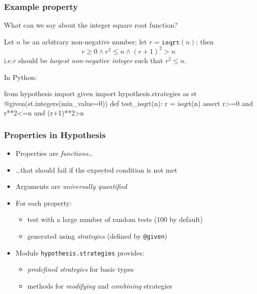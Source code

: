 \documentclass{beamer}
\begin{document}
\begin{frame}[fragile]
  \frametitle{Example property}

  What can we say about the integer square root function?
  \pause
  \medskip

  Let $n$ be an arbitrary non-negative number;
  let $r = \texttt{isqrt}(n)$; then
  \[ r\geq0 \land r^2 \leq n \land (r+1)^2>n  \]
  i.e.\@ $r$ should be \emph{largest non-negative integer} such that
  $r^2 \leq n$.
  \pause
  \medskip

  In Python:
\begin{semiverbatim}
from hypothesis import given
import hypothesis.strategies as st
@given(\alert<5>{st.integers(min_value=0)})  
def test_isqrt(\alert<4>{n}):                
    r = isqrt(n)
    assert \alert<6>{r>=0 and r**2<=n and (r+1)**2>n}   
  \end{semiverbatim}

  
\end{frame}

\begin{frame}
  \frametitle{Properties in Hypothesis}

  \begin{itemize}
  \item Properties are \emph{functions}\ldots
  \item \ldots that should fail if the expected condition is not met
  \item Arguments are \emph{universally quantified}
  \item For each property:
    \begin{itemize}
  \item test with a large number of random tests (100 by default)
  \item generated using \emph{strategies}
  (defined by \texttt{@given})
    \end{itemize}
  \item Module \texttt{hypothesis.strategies} provides:
    \begin{itemize}
    \item \emph{predefined strategies} for basic types
    \item methods for \emph{modifying} and \emph{combining} strategies
    \end{itemize}
  \end{itemize}
\end{frame}
\end{document}
